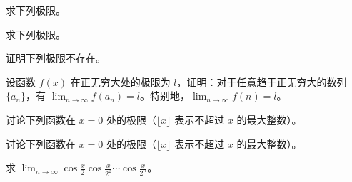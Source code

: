 \noindent\begin{minipage}{\textwidth}
求下列极限。
\end{minipage}\par\vfill
\newpage
\noindent\begin{minipage}{\textwidth}
求下列极限。
\end{minipage}\par\vfill
\noindent\begin{minipage}{\textwidth}
证明下列极限不存在。
\end{minipage}\par\vfill
\noindent\begin{minipage}{\textwidth}
设函数 $f(x)$ 在正无穷大处的极限为 $l$，证明：对于任意趋于正无穷大的数列 $\{a_n\}$，有 $\displaystyle\lim_{n\to\infty}f(a_n)=l$。特别地，$\displaystyle\lim_{n\to\infty}f(n)=l$。
\end{minipage}\par\vfill
\noindent\begin{minipage}{\textwidth}
讨论下列函数在 $x=0$ 处的极限（$\lfloor x\rfloor$ 表示不超过 $x$ 的最大整数）。
\end{minipage}\par\vfill
\newpage
\noindent\begin{minipage}{\textwidth}
讨论下列函数在 $x=0$ 处的极限（$\lfloor x\rfloor$ 表示不超过 $x$ 的最大整数）。
\end{minipage}\par\vfill
\noindent\begin{minipage}{\textwidth}
求 $\displaystyle\lim_{n\to\infty}\cos\frac x2\cos\frac x{2^2}\cdots\cos\frac x{2^n}$。
\end{minipage}\par\vfill
